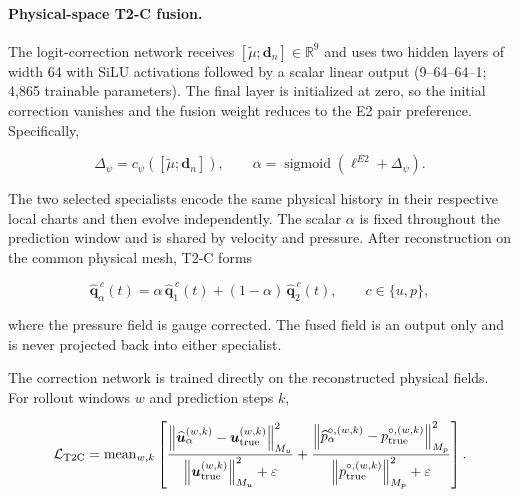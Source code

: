 \documentclass{article}
\begin{document}
\paragraph{Physical-space T2-C fusion.}
The logit-correction network receives
$[\widetilde\mu;\bm d_n]\in\mathbb R^9$ and uses two hidden layers of width 64 with SiLU
activations followed by a scalar linear output (9--64--64--1; 4,865 trainable parameters).
The final layer is initialized at zero, so the initial correction vanishes
and the fusion weight reduces to the E2 pair preference.
Specifically,


\begin{equation}
  \Delta_\psi
  =
  c_\psi
  \left(
    [\widetilde\mu;\bm d_n]
  \right),
  \qquad
  \alpha
  =
  \operatorname{sigmoid}
  \left(
    \ell^{E2}+\Delta_\psi
  \right).
  \label{eq:app_t2c_gate}
\end{equation}



The two selected specialists encode the same physical history in their
respective local charts and then evolve independently.
The scalar $\alpha$ is fixed throughout the prediction window and is shared
by velocity and pressure.
After reconstruction on the common physical mesh, T2-C forms


\begin{equation}
  \widehat{\bm q}_{\alpha}^{\,c}(t)
  =
  \alpha\,
  \widehat{\bm q}_{1}^{\,c}(t)
  +
  (1-\alpha)\,
  \widehat{\bm q}_{2}^{\,c}(t),
  \qquad
  c\in\{u,p\},
  \label{eq:app_t2c_field_fusion}
\end{equation}


where the pressure field is gauge corrected.
The fused field is an output only and is never projected back into either
specialist.

The correction network is trained directly on the reconstructed physical
fields. For rollout windows $w$ and prediction steps $k$,


\begin{equation}
  \mathcal L_{\rm T2C}
  =
  \operatorname{mean}_{w,k}
  \left[
    \frac{
      \left\|
        \widehat{\bm u}_{\alpha}^{(w,k)}
        -
        \bm u_{\rm true}^{(w,k)}
      \right\|_{M_u}^2
    }{
      \left\|
        \bm u_{\rm true}^{(w,k)}
      \right\|_{M_u}^2+\varepsilon
    }
    +
    \frac{
      \left\|
        \widehat p_{\alpha}^{\circ,(w,k)}
        -
        p_{\rm true}^{\circ,(w,k)}
      \right\|_{M_p}^2
    }{
      \left\|
        p_{\rm true}^{\circ,(w,k)}
      \right\|_{M_p}^2+\varepsilon
    }
  \right].
  \label{eq:app_t2c_loss}
\end{equation}
\end{document}
